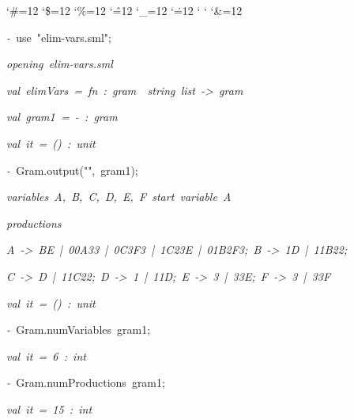 \begin{list}{}
{\setlength{\leftmargin}{\leftmargini}
\setlength{\rightmargin}{0cm}
\setlength{\itemindent}{0cm}
\setlength{\listparindent}{0cm}
\setlength{\itemsep}{0cm}
\setlength{\parsep}{0cm}
\setlength{\labelsep}{0cm}
\setlength{\labelwidth}{0cm}
\catcode`\#=12
\catcode`\$=12
\catcode`\%=12
\catcode`\^=12
\catcode`\_=12
\catcode`\.=12
\catcode`
\catcode`
\catcode`\&=12
\ttfamily}
\small
\item[]\textsl{-\ }use\ "elim-vars.sml";
\item[]\textsl{opening\ elim-vars.sml}
\item[]\textsl{val\ elimVars\ =\ fn\ :\ gram\ \ string\ list\ ->\ gram}
\item[]\textsl{val\ gram1\ =\ -\ :\ gram}
\item[]\textsl{val\ it\ =\ ()\ :\ unit}
\item[]\textsl{-\ }Gram.output("",\ gram1);
\item[]\textsl{variables\ A,\ B,\ C,\ D,\ E,\ F\ start\ variable\ A}
\item[]\textsl{productions}
\item[]\textsl{A\ ->\ BE\ |\ 00A33\ |\ 0C3F3\ |\ 1C23E\ |\ 01B2F3;\ B\ ->\ 1D\ |\ 11B22;}
\item[]\textsl{C\ ->\ D\ |\ 11C22;\ D\ ->\ 1\ |\ 11D;\ E\ ->\ 3\ |\ 33E;\ F\ ->\ 3\ |\ 33F}
\item[]\textsl{val\ it\ =\ ()\ :\ unit}
\item[]\textsl{-\ }Gram.numVariables\ gram1;
\item[]\textsl{val\ it\ =\ 6\ :\ int}
\item[]\textsl{-\ }Gram.numProductions\ gram1;
\item[]\textsl{val\ it\ =\ 15\ :\ int}
\end{list}
